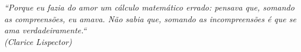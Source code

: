 \begin{epigrafe}
    \vspace*{\fill}
    \hspace{.35\textwidth}
    {\begin{minipage}{.6\textwidth}
    	\begin{flushright}
            \textit{``Porque eu fazia do amor um cálculo matemático errado: pensava que, somando as compreensões, eu amava. Não sabia que, somando as incompreensões é que se ama verdadeiramente.``\\
                (Clarice Lispector)}
        \end{flushright}
    \end{minipage}}%

\end{epigrafe}
